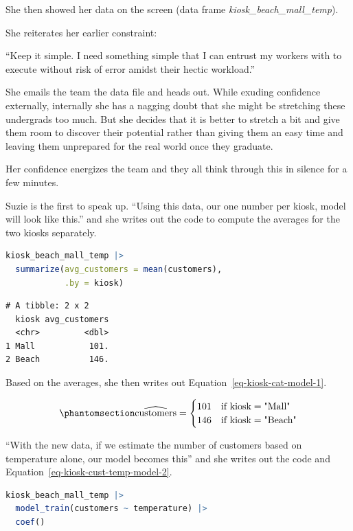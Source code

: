 \documentclass[
  12pt,
  letterpaper,
  DIV=11,
  numbers=noendperiod]{scrreprt}
\begin{document}
She then showed her data on the screen (data frame
\emph{kiosk\_beach\_mall\_temp}).

She reiterates her earlier constraint:

``Keep it simple. I need something simple that I can entrust my workers
with to execute without risk of error amidst their hectic workload.''

She emails the team the data file and heads out. While exuding
confidence externally, internally she has a nagging doubt that she might
be stretching these undergrads too much. But she decides that it is
better to stretch a bit and give them room to discover their potential
rather than giving them an easy time and leaving them unprepared for the
real world once they graduate.

Her confidence energizes the team and they all think through this in
silence for a few minutes.

Suzie is the first to speak up. ``Using this data, our one number per
kiosk, model will look like this.'' and she writes out the code to
compute the averages for the two kiosks separately.

\begin{lstlisting}[language=R]
kiosk_beach_mall_temp |> 
  summarize(avg_customers = mean(customers),
            .by = kiosk)
\end{lstlisting}

\begin{lstlisting}
# A tibble: 2 x 2
  kiosk avg_customers
  <chr>         <dbl>
1 Mall           101.
2 Beach          146.
\end{lstlisting}

Based on the averages, she then writes out
Equation~\ref{eq-kiosk-cat-model-1}.

\begin{equation}\phantomsection\label{eq-kiosk-cat-model-1}{
\widehat{\text{customers}} =
\begin{cases}
101 & \text{if } \text{kiosk} = \text{"Mall"} \\
146 & \text{if } \text{kiosk} = \text{"Beach"} 
\end{cases}
}\end{equation}

``With the new data, if we estimate the number of customers based on
temperature alone, our model becomes this'' and she writes out the code
and Equation~\ref{eq-kiosk-cust-temp-model-2}.

\begin{lstlisting}[language=R]
kiosk_beach_mall_temp |> 
  model_train(customers ~ temperature) |> 
  coef()
\end{lstlisting}
\end{document}
